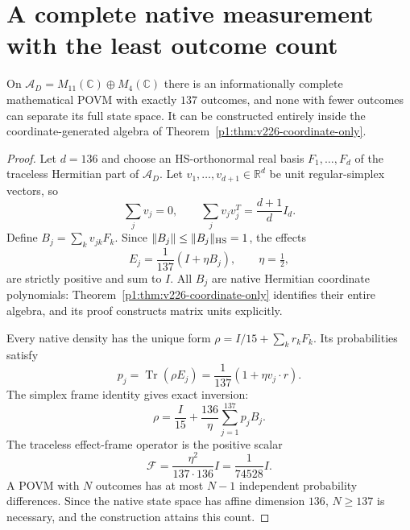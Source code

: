 \documentclass[11pt]{article}
\begin{document}
\section{A complete native measurement with the least outcome count}
\label{p1:sec:v226-tomography}

\begin{theorem}
\label{p1:thm:v226-tomography}
On $\mathcal A_D=M_{11}(\mathbb{C})\oplus M_4(\mathbb{C})$ there is an informationally
complete mathematical POVM with exactly $137$ outcomes, and none with fewer
outcomes can separate its full state space. It can be constructed entirely
inside the coordinate-generated algebra of Theorem~\ref{p1:thm:v226-coordinate-only}.
\end{theorem}
\begin{proof}
Let $d=136$ and choose an HS-orthonormal real basis
$F_1,\ldots,F_d$ of the traceless Hermitian part of $\mathcal A_D$.
Let $v_1,\ldots,v_{d+1}\in\mathbb{R}^d$ be unit regular-simplex vectors, so
\[
 \sum_jv_j=0,\qquad
 \sum_jv_jv_j^T=\frac{d+1}{d}I_d.
\]
Define $B_j=\sum_kv_{jk}F_k$. Since
$\|B_j\|\le\|B_j\|_{\rm HS}=1$, the effects
\begin{equation}\label{p1:eq:v226-effects}
 \boxed{E_j=\frac1{137}(I+\eta B_j),\qquad\eta=\tfrac12,}
\end{equation}
are strictly positive and sum to $I$. All $B_j$ are native Hermitian
coordinate polynomials: Theorem~\ref{p1:thm:v226-coordinate-only} identifies their
entire algebra, and its proof constructs matrix units explicitly.

Every native density has the unique form
$\rho=I/15+\sum_kr_kF_k$. Its probabilities satisfy
\[
 p_j=\operatorname{Tr}(\rho E_j)=\frac1{137}(1+\eta v_j\cdot r).
\]
The simplex frame identity gives exact inversion:
\begin{equation}\label{p1:eq:v226-reconstruction}
 \boxed{\rho=\frac I{15}+\frac{136}{\eta}\sum_{j=1}^{137}p_jB_j.}
\end{equation}
The traceless effect-frame operator is the positive scalar
\begin{equation}\label{p1:eq:v226-frame}
 \mathcal F=\frac{\eta^2}{137\cdot136}I
            =\frac1{74528}I.
\end{equation}
A POVM with $N$ outcomes has at most $N-1$ independent probability
differences. Since the native state space has affine dimension $136$,
$N\ge137$ is necessary, and the construction attains this count.
\end{proof}
\end{document}
